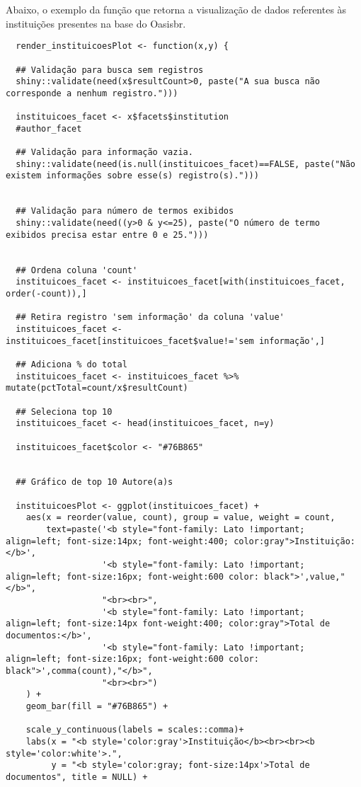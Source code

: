 \documentclass[
]{article}
\begin{document}
Abaixo, o exemplo da função que retorna a visualização de dados
referentes às instituições presentes na base do Oasisbr.

\begin{verbatim}
  render_instituicoesPlot <- function(x,y) {
  
  ## Validação para busca sem registros
  shiny::validate(need(x$resultCount>0, paste("A sua busca não corresponde a nenhum registro.")))  
  
  instituicoes_facet <- x$facets$institution
  #author_facet
  
  ## Validação para informação vazia.
  shiny::validate(need(is.null(instituicoes_facet)==FALSE, paste("Não existem informações sobre esse(s) registro(s).")))
  
  
  ## Validação para número de termos exibidos
  shiny::validate(need((y>0 & y<=25), paste("O número de termo exibidos precisa estar entre 0 e 25.")))
  
  
  ## Ordena coluna 'count'
  instituicoes_facet <- instituicoes_facet[with(instituicoes_facet, order(-count)),]
  
  ## Retira registro 'sem informação' da coluna 'value'
  instituicoes_facet <- instituicoes_facet[instituicoes_facet$value!='sem informação',]
  
  ## Adiciona % do total
  instituicoes_facet <- instituicoes_facet %>% mutate(pctTotal=count/x$resultCount)
  
  ## Seleciona top 10
  instituicoes_facet <- head(instituicoes_facet, n=y)
  
  instituicoes_facet$color <- "#76B865"
  
  
  ## Gráfico de top 10 Autore(a)s
  
  instituicoesPlot <- ggplot(instituicoes_facet) +
    aes(x = reorder(value, count), group = value, weight = count, 
        text=paste('<b style="font-family: Lato !important; align=left; font-size:14px; font-weight:400; color:gray">Instituição:</b>',
                   '<b style="font-family: Lato !important; align=left; font-size:16px; font-weight:600 color: black">',value,"</b>",
                   "<br><br>",
                   '<b style="font-family: Lato !important; align=left; font-size:14px font-weight:400; color:gray">Total de documentos:</b>',
                   '<b style="font-family: Lato !important; align=left; font-size:16px; font-weight:600 color: black">',comma(count),"</b>",
                   "<br><br>")
    ) +
    geom_bar(fill = "#76B865") +
    
    scale_y_continuous(labels = scales::comma)+
    labs(x = "<b style='color:gray'>Instituição</b><br><br><b style='color:white'>.", 
         y = "<b style='color:gray; font-size:14px'>Total de documentos", title = NULL) +
    

\end{verbatim}
\end{document}
